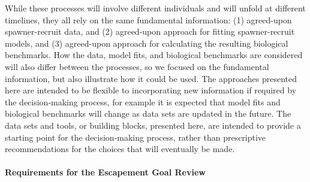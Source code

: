 \documentclass[french,11pt]{book}
\begin{document}
While these processes will involve different individuals and will unfold at different timelines, they all rely on the same fundamental information: (1) agreed-upon spawner-recruit data, and (2) agreed-upon approach for fitting spawner-recruit models, and (3) agreed-upon approach for calculating the resulting biological benchmarks. How the data, model fits, and biological benchmarks are considered will also differ between the processes, so we focused on the fundamental information, but also illustrate how it could be used. The approaches presented here are intended to be flexible to incorporating new information if required by the decision-making process, for example it is expected that model fits and biological benchmarks will change as data sets are updated in the future. The data sets and tools, or building blocks, presented here, are intended to provide a starting point for the decision-making process, rather than prescriptive recommendations for the choices that will eventually be made.

\paragraph{Requirements for the Escapement Goal Review}\label{requirements-for-the-escapement-goal-review}
\end{document}
